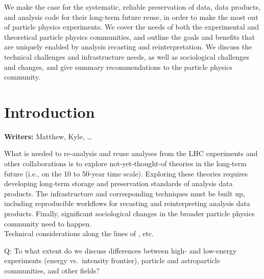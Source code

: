 \documentclass[11pt]{article}
\begin{document}
\begin{Abstract}
\noindent We make the case for the systematic, reliable preservation of data, data products, and analysis code for their long-term future reuse, in order to make the most out of particle physics experiments.
We cover the needs of both the experimental and theoretical particle physics communities, and outline the goals and benefits that are uniquely enabled by analysis recasting and reinterpretation. 
We discuss the technical challenges and infrastructure needs, as well as sociological challenges and changes, and give summary recommendations to the particle physics community.
\end{Abstract}

\clearpage

\tableofcontents

\section{Introduction}

\noindent\textbf{Writers:} Matthew, Kyle, \ldots

What is needed to re-analysis and reuse analyses from the LHC experiments and other collaborations is to explore not-yet-thought-of theories in the long-term future (i.e., on the 10 to 50-year time scale).
Exploring these theories requires developing long-term storage and preservation standards of analysis data products. The infrastructure and corresponding techniques must be built up, including reproducible workflows for recasting and reinterpreting analysis data products. Finally, significant sociological changes in the broader particle physics community need to happen.\\
Technical considerations along the lines of \cite{LHCReinterpretationForum:2020xtr,Cranmer:2021urp}, etc. \\


Q: To what extent do we discuss differences between high- and low-energy experiments (energy vs.~intensity frontier), particle and astroparticle communities, and other fields?


\end{document}
